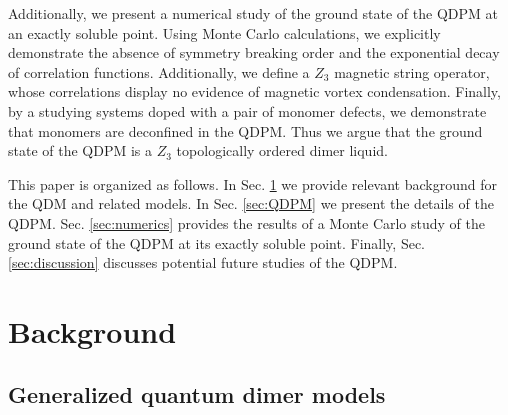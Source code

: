 \documentclass[twocolumn,prb,aps,floatfix,superscriptaddress]{revtex4-1}
\newcommand{\secref}[1]{Sec. \ref{#1}}
\begin{document}
Additionally, we present a numerical study of the ground state of the QDPM at an exactly soluble point. Using Monte Carlo calculations, we explicitly demonstrate the absence of symmetry breaking order and the exponential decay of correlation functions. Additionally, we define a $Z_3$ magnetic string operator, whose correlations display no evidence of magnetic vortex condensation. Finally, by a studying systems doped with a pair of  monomer defects, we demonstrate that monomers are deconfined in the QDPM. Thus we argue that the ground state of the QDPM is a $Z_3$ topologically ordered dimer liquid.

This paper is organized as follows. In \secref{sec:Background} we provide relevant background for the QDM and related models. In \secref{sec:QDPM} we present the details of the QDPM. \secref{sec:numerics} provides the results of a Monte Carlo study of the ground state of the QDPM at its exactly soluble point. Finally, \secref{sec:discussion} discusses potential future studies of the QDPM.


\section{Background}
\label{sec:Background}

\subsection{Generalized quantum dimer models}
\label{sec:GQDM}
\end{document}
